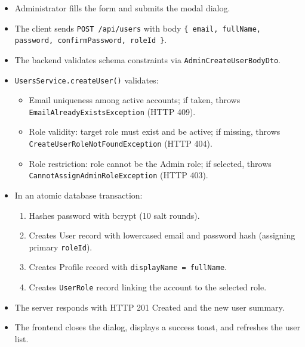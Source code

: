 \begin{itemize}[leftmargin=1.6em,topsep=3pt,itemsep=2pt,parsep=0pt,label=$\bullet$]
    \item Administrator fills the form and submits the modal dialog.
    \item The client sends \texttt{POST /api/users} with body \texttt{\{ email, fullName, password, confirmPassword, roleId \}}.
    \item The backend validates schema constraints via \texttt{AdminCreateUserBodyDto}.
    \item \texttt{UsersService.createUser()} validates:
        \begin{itemize}[leftmargin=1.6em,topsep=2pt,itemsep=2pt,parsep=0pt]
            \item Email uniqueness among active accounts; if taken, throws \texttt{Email\allowbreak{}Already\allowbreak{}Exists\allowbreak{}Exception} (HTTP 409).
            \item Role validity: target role must exist and be active; if missing, throws \texttt{Create\allowbreak{}User\allowbreak{}Role\allowbreak{}Not\allowbreak{}Found\allowbreak{}Exception} (HTTP 404).
            \item Role restriction: role cannot be the Admin role; if selected, throws \texttt{Cannot\allowbreak{}Assign\allowbreak{}Admin\allowbreak{}Role\allowbreak{}Exception} (HTTP 403).
        \end{itemize}
    \item In an atomic database transaction:
        \begin{enumerate}[leftmargin=1.6em,topsep=2pt,itemsep=2pt,parsep=0pt]
            \item Hashes password with bcrypt (10 salt rounds).
            \item Creates User record with lowercased email and password hash (assigning primary \texttt{roleId}).
            \item Creates Profile record with \texttt{displayName = fullName}.
            \item Creates \texttt{UserRole} record linking the account to the selected role.
        \end{enumerate}
    \item The server responds with HTTP 201 Created and the new user summary.
    \item The frontend closes the dialog, displays a success toast, and refreshes the user list.
\end{itemize}

